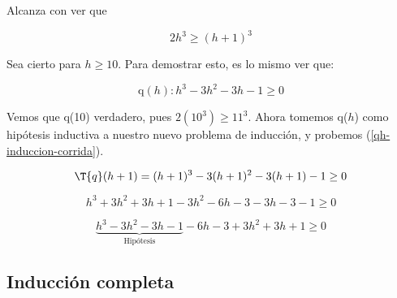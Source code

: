 \documentclass[../main.tex]{subfiles}
\begin{document}
Alcanza con ver que

\begin{equation}
    2h^3 \geqslant (h+1)^3
\end{equation}

Sea cierto para $h \geqslant 10$. Para demostrar esto, es lo mismo ver que:

\begin{equation} \label{qh-induccion-corrida}
    \text{q}(h): h^3 - 3h^2 - 3h -1 \geq 0
\end{equation}

Vemos que q(10) verdadero, pues $2(10^3) \geqslant 11^3$. Ahora tomemos q($h$) como hipótesis inductiva a nuestro nuevo problema de inducción, y probemos (\ref{qh-induccion-corrida}).

\begin{equation}
    \T{q}(h+1) = (h+1)^3 - 3(h+1)^2 - 3(h+1) - 1 \geq 0
\end{equation}

\begin{equation*}
    h^3 + 3h^2 + 3h + 1 - 3h^2 - 6h - 3 -3h - 3 -1 \geq 0
\end{equation*}

\begin{equation*}
    \underbrace{h^3 - 3h^2 -3h - 1}_{\text{Hipótesis}} - 6h - 3 + 3h^2 + 3h + 1 \geq 0
\end{equation*}

\subsection{Inducción completa}
\end{document}
